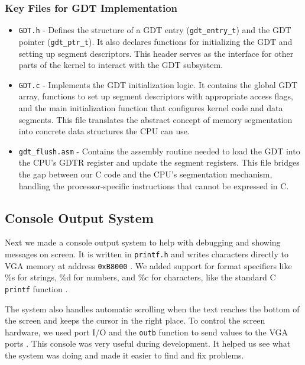 \documentclass[a4paper,11pt]{article}
\begin{document}
\subsubsection{Key Files for GDT Implementation}
\begin{itemize}
    \item \texttt{GDT.h} - Defines the structure of a GDT entry (\texttt{gdt\_entry\_t}) and the GDT pointer (\texttt{gdt\_ptr\_t}). It also declares functions for initializing the GDT and setting up segment descriptors. This header serves as the interface for other parts of the kernel to interact with the GDT subsystem.
    
    \item \texttt{GDT.c} - Implements the GDT initialization logic. It contains the global GDT array, functions to set up segment descriptors with appropriate access flags, and the main initialization function that configures kernel code and data segments. This file translates the abstract concept of memory segmentation into concrete data structures the CPU can use.
    
    \item \texttt{gdt\_flush.asm} - Contains the assembly routine needed to load the GDT into the CPU's GDTR register and update the segment registers. This file bridges the gap between our C code and the CPU's segmentation mechanism, handling the processor-specific instructions that cannot be expressed in C.
\end{itemize}

\subsection{Console Output System}

Next we made a console output system to help with debugging and showing messages on screen. It is written in \texttt{printf.h} and writes characters directly to VGA memory at address \texttt{0xB8000} \cite{VGA}. We added support for format specifiers like \%s for strings, \%d for numbers, and \%c for characters, like the standard C \texttt{printf} function \cite{PrintFIC}.

The system also handles automatic scrolling when the text reaches the bottom of the screen and keeps the cursor in the right place. To control the screen hardware, we used port I/O and the \texttt{outb} function to send values to the VGA ports \cite{OSDev_IOPorts}.
This console was very useful during development. It helped us see what the system was doing and made it easier to find and fix problems.
\end{document}
